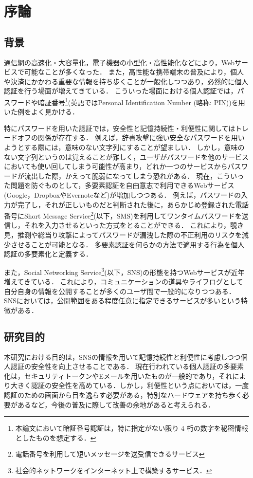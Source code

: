 \chapter{序論}\label{chap:introduction}
\section{背景}
通信網の高速化・大容量化，電子機器の小型化・高性能化などにより，Webサービスで可能なことが多くなった．
また，高性能な携帯端末の普及により，個人や決済にかかわる重要な情報を持ち歩くことが一般化しつつあり，必然的に個人認証を行う場面が増えてきている．
こういった場面における個人認証では，パスワードや暗証番号\footnote{本論文において暗証番号認証は，特に指定がない限り 4 桁の数字を秘密情報としたものを想定する．}(英語ではPersonal Identification Number (略称: PIN))を用いた例をよく見かける．

特にパスワードを用いた認証では，安全性と記憶持続性・利便性に関してはトレードオフの関係が存在する．
例えば，辞書攻撃に強い安全なパスワードを用いようとする際には，意味のない文字列にすることが望ましい．
しかし，意味のない文字列というのは覚えることが難しく，ユーザがパスワードを他のサービスにおいても使い回してしまう可能性が高まり，どれか一つのサービスからパスワードが流出した際，かえって脆弱になってしまう恐れがある．
現在，こういった問題を防ぐものとして，多要素認証を自由意志で利用できるWebサービス(Google\cite{google}，Dropbox\cite{dropbox}やEvernote\cite{evernote}など)が増加しつつある．
例えば，パスワードの入力が完了し，それが正しいものだと判断された後に，あらかじめ登録された電話番号にShort Message Service\footnote{電話番号を利用して短いメッセージを送受信できるサービス}(以下，SMS)を利用してワンタイムパスワードを送信し，それを入力させるといった方式をとることができる．
これにより，覗き見，推測や総当り攻撃によってパスワードが漏洩した際の不正利用のリスクを減少させることが可能となる．
多要素認証を何らかの方法で適用する行為を個人認証の多要素化と定義する．

また，Social Networking Service\footnote{社会的ネットワークをインターネット上で構築するサービス．}(以下，SNS)の形態を持つWebサービスが近年増えてきている．
これにより，コミュニケーションの道具やライフログとして自分自身の情報を公開することが多くのユーザ間で一般的になりつつある．
SNSにおいては，公開範囲をある程度任意に指定できるサービスが多いという特徴がある．

\section{研究目的}
本研究における目的は，SNSの情報を用いて記憶持続性と利便性に考慮しつつ個人認証の安全性を向上させることである．
現在行われている個人認証の多要素化は，セキュリティトークンやEメールを用いたものが一般的であり，それにより大きく認証の安全性を高めている．しかし，利便性という点においては，一度認証のための画面から目を逸らす必要がある，特別なハードウェアを持ち歩く必要があるなど，今後の普及に際して改善の余地があると考えられる．

